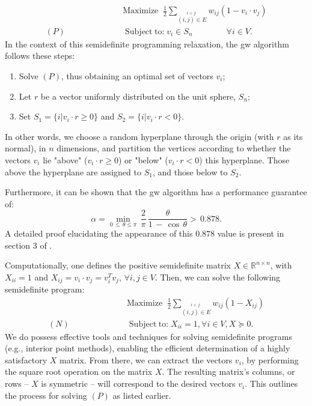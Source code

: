 \vspace{-5mm}
\begin{equation}
  \begin{split}
  &\mathrm{Maximize}\;\;\frac{1}{2}\sum_{\stackrel{i < j:}{(i,j)\in E}}w_{i j}(1-v_{i} \cdot v_{j}) \\
  (P)\qquad\qquad\qquad&\operatorname{Subject\;to:}v_{i}\in S_n \qquad\qquad\forall i\in V.
  \end{split}
\end{equation}
In the context of this semidefinite programming relaxation, the \acrshort{gw} algorithm follows these steps:
\begin{enumerate}
  \item Solve $(P)$, thus obtaining an optimal set of vectors $v_{i}$;\vspace{-2.5mm}
  \item Let $r$ be a vector uniformly distributed on the unit sphere, $S_n$;\vspace{-2.5mm}
  \item Set $S_1 = \{i|v_{i} \cdot r \geq 0\}$ and $S_2 = \{i|v_{i} \cdot r < 0\}$.
\end{enumerate}
In other words, we choose a random hyperplane through the origin (with $r$ as its normal), in $n$ dimensions, and partition the vertices according to whether the vectors $v_{i}$ lie "above" ($v_{i} \cdot r \geq 0$) or "below" ($v_{i} \cdot r < 0$) this hyperplane. Those above the hyperplane are assigned to $S_1$, and those below to $S_2$.

Furthermore, it can be shown that the \acrshort{gw} algorithm has a performance guarantee of:
\begin{equation}
  \alpha=\operatorname*{min}_{0\,\leq\,\theta\leq\pi}\,\frac{2}{\pi}\,\frac{\theta}{1\,-\,\cos\,\theta} > \,0.878.
\end{equation}
A detailed proof elucidating the appearance of this $0.878$ value is present in section $3$ of \cite{GW-Algorithm}.

Computationally, one defines the positive semidefinite matrix $X \in \mathbb{R}^{n \times n}$, with $X_{ii} = 1$ and $X_{ij} = v_{i} \cdot v_{j} = v_{i}^{T} v_j$, $\forall i, j \in V$. Then, we can solve the following semidefinite program:
\begin{equation}
  \begin{split}
  &\mathrm{Maximize}\;\;\frac{1}{2}\sum_{\stackrel{i < j:}{(i,j)\in E}}w_{i j}(1-X_{ij}) \\
  (N)\qquad\qquad\qquad&\operatorname{Subject\;to:}X_{ii} = 1, \forall i\in V, X \succeq 0.
  \end{split}
\end{equation}
We do possess effective tools and techniques for solving semidefinite programs (e.g., interior point methods), enabling the efficient determination of a highly satisfactory $X$ matrix. From there, we can extract the vectors $v_{i}$, by performing the square root operation on the matrix $X$. The resulting matrix's columns, or rows – $X$ is symmetric – will correspond to the desired vectors $v_{i}$. This outlines the process for solving $(P)$ as listed earlier.


